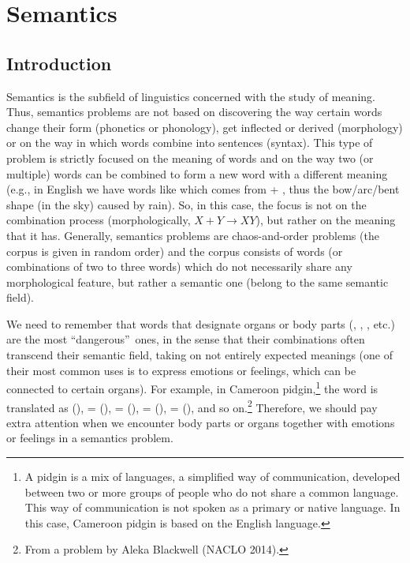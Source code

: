 \begin{refsection}
\hypertarget{semantics}{%
\chapter{Semantics}\label{chap-semantics}}

\section{Introduction}\largerpage

 Semantics is the subfield of linguistics concerned with the study of meaning. Thus, semantics problems are not based on discovering the way certain words change their form (phonetics or phonology), get inflected or derived (morphology) or on the way in which words combine into sentences (syntax). This type of problem is strictly focused on the meaning of words and on the way two (or multiple) words can be combined to form a new word with a different meaning (e.g., in English we have words like  which comes from  + , thus the bow/arc/bent shape (in the sky) caused by rain). So, in this case, the focus is not on the combination process (morphologically, $X + Y \rightarrow XY$), but rather on the meaning that it has. Generally, semantics problems are chaos-and-order problems (the corpus is given in random order) and the corpus consists of words (or combinations of two to three words) which do not necessarily share any morphological feature, but rather a semantic one (belong to the same semantic field). 
 
 We need to remember that words that designate organs or body parts (, , , etc.) are the most “dangerous”\ ones, in the sense that their combinations often transcend their semantic field, taking on not entirely expected meanings (one of their most common uses is to express emotions or feelings, which can be connected to certain organs). For example, in Cameroon pidgin,\footnote{A pidgin is a mix of languages, a simplified way of communication, developed between two or more groups of people who do not share a common language. This way of communication is not spoken as a primary or native language. In this case, Cameroon pidgin is based on the English language.} the word  is translated as  (),  =  (),  =  (),  =  (),  =  (), and so on.\footnote{From a problem by Aleka Blackwell (NACLO 2014).} Therefore, we should pay extra attention when we encounter body parts or organs together with emotions or feelings in a semantics problem.


\end{refsection}
